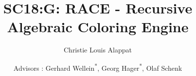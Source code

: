 \documentclass[sigplan]{acmart}
\begin{document}
	
	\title[RACE]{SC18:G: RACE - Recursive Algebraic Coloring Engine}
	
	\author{Christie Louis Alappat} 
	
	
	\author{Advisors : Gerhard Wellein\textsuperscript{*}, Georg
		Hager\textsuperscript{*}, Olaf Schenk } 
	
	
	
	
	
	
	
	\renewcommand{\shortauthors}{C. Alappat et al.}
	
	

	
	
	
	
	
	\maketitle
	
	
	
	
	
	
\end{document}
